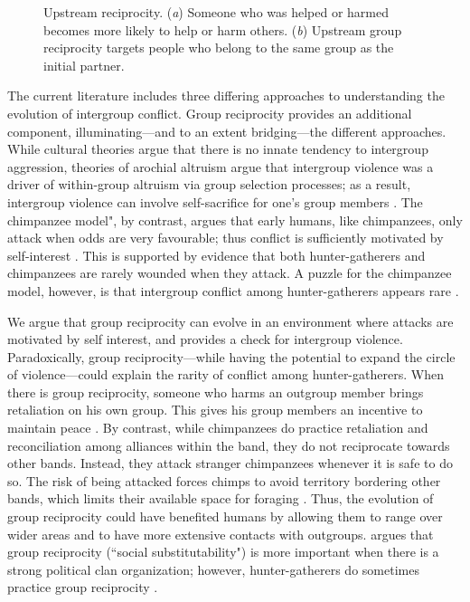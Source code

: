 \documentclass[12pt,a4paper]{article}\usepackage[]{graphicx}\usepackage[]{color}
\begin{document}
\begin{figure}
\begin{center}
\begin{subfigure}[b]{0.4\textwidth}
            \caption{}\label{group}
        \end{subfigure}
        \caption{Upstream reciprocity. (\textit{a}) Someone who was helped or harmed becomes more likely to help or harm others. (\textit{b})
    Upstream group reciprocity targets people who belong to
    the same group as the initial partner.}
        \label{fig:illustration}
	\end{center}
\end{figure}

The current literature includes three differing approaches to understanding the evolution of intergroup conflict. Group reciprocity provides an additional component, illuminating---and to an extent bridging---the different approaches.
While cultural theories argue that there is no innate tendency to intergroup aggression, theories of arochial altruism argue that intergroup violence was a driver of within-group altruism via group selection processes; as a result, intergroup violence can involve self-sacrifice for one's group
members \citep{choi2007coevolution,bowles2009did}. The chimpanzee model", by contrast, argues that early humans, like chimpanzees, only attack when odds are very favourable; thus conflict is sufficiently motivated by self-interest 
\citep{wrangham2012intergroup}. This is supported by evidence that both hunter-gatherers and chimpanzees are rarely wounded when they attack. A puzzle for the chimpanzee model, however, is that intergroup conflict among hunter-gatherers appears rare \citep{fry2013lethal}. 

We argue that group reciprocity can evolve in an environment where attacks are motivated by self interest, and provides a check for intergroup violence. Paradoxically, group reciprocity---while having the potential to expand the circle of violence---could explain the rarity of conflict among hunter-gather\-ers.
When there is group reciprocity, someone who harms an outgroup member brings retaliation on his own group. This gives his group members an incentive to maintain peace \citep{boehm1984blood}. By contrast, while 
chimpanzees do practice retaliation and reconciliation among alliances within the band, they  do not reciprocate towards other bands. Instead, they attack stranger chimpanzees whenever it is safe to do so. The risk of being attacked forces chimps to avoid territory bordering other bands, which limits their available space for foraging \citep{wilson2003intergroup}. Thus, the evolution of group reciprocity could have benefited humans by allowing them to range over wider areas and to have more extensive contacts with outgroups. \citet{kelly2000warless} argues that group reciprocity (``social substitutability") is more important when there is a strong political clan organization; however, hunter-gatherers do sometimes practice group reciprocity \citep{boehm2012ancestral}.
\end{document}
